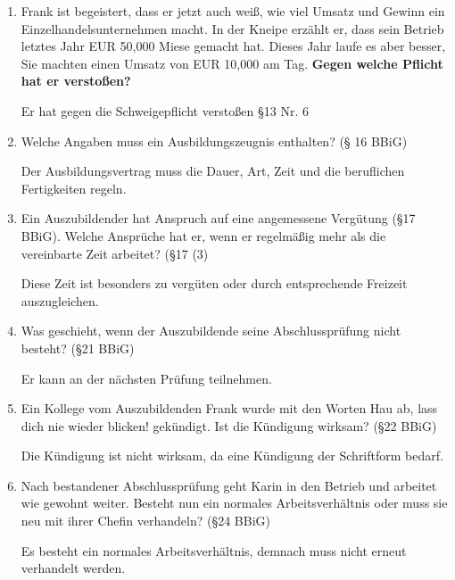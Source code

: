 \documentclass[a4paper,11pt]{scrartcl}	%
\begin{document}
\begin{enumerate}
	\item Frank ist begeistert, dass er jetzt auch weiß, wie viel Umsatz und Gewinn ein Einzelhandelsunternehmen 
	macht. In der Kneipe erzählt er, dass sein Betrieb letztes Jahr EUR 50,000 Miese gemacht hat. Dieses Jahr laufe
	es aber besser, Sie machten einen Umsatz von EUR 10,000 am Tag. 
	\textbf{Gegen welche Pflicht hat er verstoßen?}\par
	Er hat gegen die Schweigepflicht verstoßen §13 Nr. 6
	\item Welche Angaben muss ein Ausbildungszeugnis enthalten? (§ 16 BBiG)\par
	Der Ausbildungsvertrag muss die Dauer, Art, Zeit und die beruflichen Fertigkeiten regeln.
	\item Ein Auszubildender hat Anspruch auf eine angemessene Vergütung (§17 BBiG). Welche Ansprüche hat er, wenn
	er regelmäßig mehr als die vereinbarte Zeit arbeitet? (§17 (3)\par
	Diese Zeit ist besonders zu vergüten oder durch entsprechende Freizeit auszugleichen.
	\item Was geschieht, wenn der Auszubildende seine Abschlussprüfung nicht besteht? (§21 BBiG)\par
	Er kann an der nächsten Prüfung teilnehmen.
	\item Ein Kollege vom Auszubildenden Frank wurde mit den Worten \glqq Hau ab, lass dich nie wieder blicken!\grqq
	gekündigt. Ist die Kündigung wirksam? (§22 BBiG)\par
	Die Kündigung ist nicht wirksam, da eine Kündigung der Schriftform bedarf.
	\item Nach bestandener Abschlussprüfung geht Karin in den Betrieb und arbeitet wie gewohnt weiter.
	Besteht nun ein normales Arbeitsverhältnis oder muss sie neu mit ihrer Chefin verhandeln? (§24 BBiG)\par
	Es besteht ein normales Arbeitsverhältnis, demnach muss nicht erneut verhandelt werden.
		
\end{enumerate}
\end{document}
